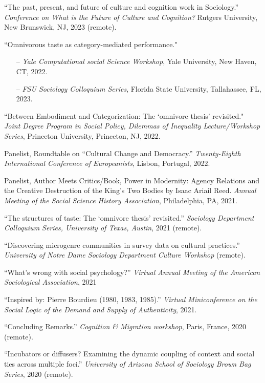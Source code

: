 
\ind ``The past, present, and future of culture and cognition work in Sociology.'' {\em Conference on What is the Future of Culture and Cognition?} Rutgers University, New Brunswick, NJ, 2023 (remote). 

\ind ``Omnivorous taste as category-mediated performance."  
\begin{itemize}[leftmargin=0.8in, topsep = 0pt]
	\setlength\itemsep{-0.55em}
	\item[--] {\em Yale Computational social Science Workshop}, Yale University, New Haven, CT, 2022.
	\item[--] {\em FSU Sociology Colloquium Series}, Florida State University, Tallahassee, FL, 2023.
\end{itemize}

\ind ``Between Embodiment and Categorization: The `omnivore thesis' revisited." {\em Joint Degree Program in Social Policy, Dilemmas of Inequality Lecture/Workshop Series}, Princeton University, Princeton, NJ, 2022. 

\ind Panelist, Roundtable on ``Cultural Change and Democracy.'' {\em Twenty-Eighth International Conference of Europeanists}, Lisbon, Portugal, 2022. 

\ind Panelist, Author Meets Critics/Book, Power in Modernity: Agency Relations and the Creative Destruction of the King's Two Bodies by Isaac Ariail Reed. {\em Annual Meeting of the Social Science History Association}, Philadelphia, PA, 2021.

\ind ``The structures of taste: The `omnivore thesis' revisited.'' {\em Sociology Department Colloquium Series, University of Texas, Austin}, 2021 (remote). 

\ind ``Discovering microgenre communities in survey data on cultural practices.'' {\em University of Notre Dame Sociology Department Culture Workshop} (remote).

\ind ``What's wrong with social psychology?'' {\em Virtual Annual Meeting of the American Sociological Association}, 2021

\ind ``Inspired by: Pierre Bourdieu (1980, 1983, 1985).'' {\em Virtual Miniconference on the Social Logic of the Demand and Supply of Authenticity}, 2021.

\ind ``Concluding Remarks.'' {\em Cognition \& Migration workshop}, Paris, France, 2020 (remote).

\ind ``Incubators or diffusers? Examining the dynamic coupling of context and social ties across multiple foci.'' {\em University of Arizona School of Sociology Brown Bag Series},  2020 (remote).

